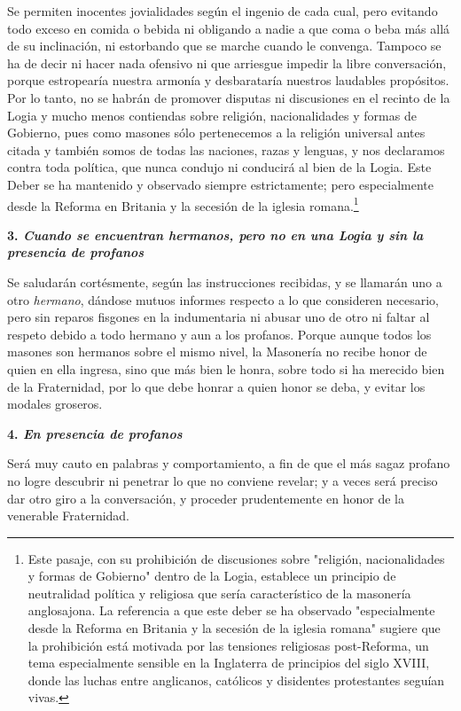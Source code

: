 \documentclass[a4paper,12pt,twoside]{book}
\begin{document}
\noindent Se permiten inocentes jovialidades según el ingenio de cada cual, pero evitando todo exceso en comida o bebida ni obligando a nadie a que coma o beba más allá de su inclinación, ni estorbando que se marche cuando le convenga. Tampoco se ha de decir ni hacer nada ofensivo ni que arriesgue impedir la libre conversación, porque estropearía nuestra armonía y desbarataría nuestros laudables propósitos. Por lo tanto, no se habrán de promover disputas ni discusiones en el recinto de la Logia y mucho menos contiendas sobre religión, nacionalidades y formas de Gobierno, pues como masones sólo pertenecemos a la religión universal antes citada y también somos de todas las naciones, razas y lenguas, y nos declaramos contra toda política, que nunca condujo ni conducirá al bien de la Logia. Este Deber se ha mantenido y observado siempre estrictamente; pero especialmente desde la Reforma en Britania y la secesión de la iglesia romana.\footnote{Este pasaje, con su prohibición de discusiones sobre "religión, nacionalidades y formas de Gobierno" dentro de la Logia, establece un principio de neutralidad política y religiosa que sería característico de la masonería anglosajona. La referencia a que este deber se ha observado "especialmente desde la Reforma en Britania y la secesión de la iglesia romana" sugiere que la prohibición está motivada por las tensiones religiosas post-Reforma, un tema especialmente sensible en la Inglaterra de principios del siglo XVIII, donde las luchas entre anglicanos, católicos y disidentes protestantes seguían vivas.}

\vspace{0.3cm}
\noindent \textbf{3. \textit{Cuando se encuentran hermanos, pero no en una Logia y sin la presencia de profanos}}

\noindent Se saludarán cortésmente, según las instrucciones recibidas, y se llamarán uno a otro \textit{hermano}, dándose mutuos informes respecto a lo que consideren necesario, pero sin reparos fisgones en la indumentaria ni abusar uno de otro ni faltar al respeto debido a todo hermano y aun a los profanos. Porque aunque todos los masones son hermanos sobre el mismo nivel, la Masonería no recibe honor de quien en ella ingresa, sino que más bien le honra, sobre todo si ha merecido bien de la Fraternidad, por lo que debe honrar a quien honor se deba, y evitar los modales groseros.

\vspace{0.3cm}
\noindent \textbf{4. \textit{En presencia de profanos}}

\noindent Será muy cauto en palabras y comportamiento, a fin de que el más sagaz profano no logre descubrir ni penetrar lo que no conviene revelar; y a veces será preciso dar otro giro a la conversación, y proceder prudentemente en honor de la venerable Fraternidad.
\end{document}
